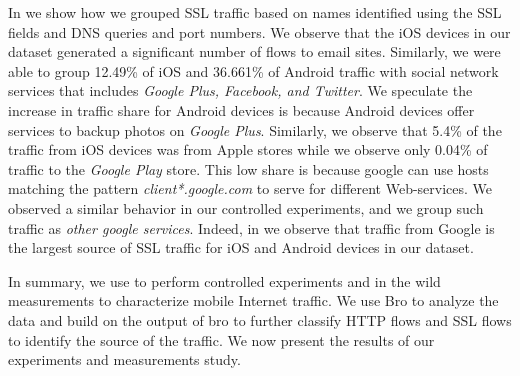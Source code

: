 In  we show how we grouped SSL traffic based on names identified using the SSL fields and DNS queries and port numbers.
We observe that the iOS devices in our dataset generated a significant number of flows to email sites.
Similarly, we were able to group 12.49\% of iOS and 36.661\% of Android traffic with social network services that includes \emph{Google Plus, Facebook, and Twitter}.
We speculate the increase in traffic share for Android devices is because Android devices offer services to backup photos on \emph{Google Plus}.
Similarly, we observe that 5.4\% of the traffic from iOS devices was from Apple stores while we observe only 0.04\% of traffic to the \emph{Google Play} store. 
This low share is because google can use hosts matching the pattern \emph{client*.google.com} to serve for different Web-services.
We observed a similar behavior in our controlled experiments, and we group such traffic as \emph{other google services}.
Indeed, in  we observe that traffic from Google is the largest source of SSL traffic for iOS and Android devices in our dataset. 

In summary, we use \platname to perform controlled experiments and in the wild measurements to characterize mobile Internet traffic. 
We use Bro to analyze the data and build on the output of bro to further classify HTTP flows and SSL flows to identify the source of the traffic. 
We now present the results of our experiments and measurements study. 





